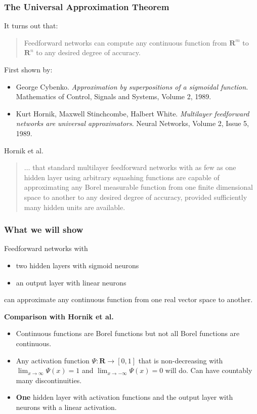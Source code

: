 \documentclass[11pt]{beamer}
\newcommand{\R}{\ensuremath{\mathbf{R}}}
\begin{document}
\begin{frame}[t,fragile]
\frametitle{The Universal Approximation Theorem}
{\small It turns out that:
\begin{quote}
Feedforward networks can compute any continuous function from $\R^m$
to $\R^n$ to any desired degree of accuracy.
\end{quote}

First shown by:
\begin{itemize}
    \item George Cybenko. \emph{Approximation by superpositions of a sigmoidal
        function}. Mathematics of Control, Signals and Systems, Volume 2, 1989.

    \item Kurt Hornik, Maxwell Stinchcombe, Halbert White. \emph{Multilayer
        feedforward networks are universal approximators}. Neural Networks,
        Volume 2, Issue 5, 1989.
\end{itemize}
Hornik et al.
\begin{quote}
 $\ldots$ that standard multilayer feedforward networks with as few as
one hidden layer using arbitrary squashing functions are capable of
approximating any Borel measurable function from one finite dimensional
space to another to any desired degree of accuracy, provided sufficiently
many hidden units are available.
\end{quote}
}
\end{frame}

\begin{frame}[t,fragile]
\frametitle{What we will show}
{\small
Feedforward networks with
\begin{itemize}
    \item two hidden layers with sigmoid neurons
    \item an output layer with linear neurons
\end{itemize}
can approximate any continuous function from one real vector space
to another.

\medskip
\textbf{Comparison with Hornik et al.}
\begin{itemize}
    \item Continuous functions are Borel functions but not all
        Borel functions are continuous.
    \item Any activation function $\Psi \colon \R \to [0, 1]$
        that is non-decreasing with $\lim_{x \to \infty} \Psi (x)= 1$ and
        $\lim_{x \to -\infty} \Psi (x) = 0$ will do. Can have countably
        many discontinuities.
    \item \textbf{One} hidden layer with activation functions and the output layer
        with neurons with a linear activation.
\end{itemize}
}
\end{frame}
\end{document}
